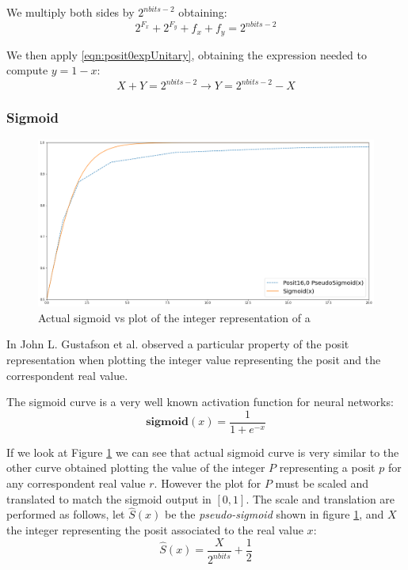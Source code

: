 We multiply both sides by $2^{nbits - 2}$ obtaining:
\begin{equation}
    2^{F_x} + 2^{F_y} + f_x + f_y = 2^{nbits - 2}
\end{equation}

We then apply  \eqref{eqn:posit0expUnitary}, obtaining the expression needed to compute $y = 1 - x$:
\begin{equation}
    X + Y = 2^{nbits - 2} \xrightarrow{} Y = 2^{nbits - 2} - X
\end{equation}



\subsubsection{Sigmoid}
\begin{figure}
    \centering
    \includegraphics[width=\linewidth]{img/sigmoidPosit160.png}
    \caption{Actual sigmoid vs plot of the integer representation of a }
    \label{fig:posit160Sigmoid}
\end{figure}

In \cite{gustafson2017beating} John L. Gustafson et al. observed a particular property of the posit representation when plotting the integer value representing the posit and the correspondent real value.

The sigmoid curve is a very well known activation function for neural networks:
\begin{equation}
    \mathbf{sigmoid}(x) = \frac{1}{1 + e^{-x}}
\end{equation}

If we look at Figure \ref{fig:posit160Sigmoid} we can see that actual sigmoid curve is very similar to the other curve obtained plotting the value of the integer $P$ representing a posit $p$ for any correspondent real value $r$. However the plot for $P$ must be scaled and translated to match the sigmoid output in $[0,1]$. The scale and translation are performed as follows, let $\hat{S}(x)$ be the \textit{pseudo-sigmoid} shown in figure \ref{fig:posit160Sigmoid}, and $X$ the integer representing the posit associated to the real value $x$:
\begin{equation}
    \hat{S}(x) = \frac{X}{2^{nbits}} + \frac{1}{2}
\end{equation}

